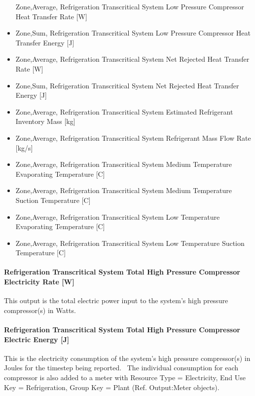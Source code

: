 \begin{itemize}
  Zone,Average, Refrigeration Transcritical System Low Pressure Compressor Heat Transfer Rate {[}W{]}
\item
  Zone,Sum, Refrigeration Transcritical System Low Pressure Compressor Heat Transfer Energy {[}J{]}
\item
  Zone,Average, Refrigeration Transcritical System Net Rejected Heat Transfer Rate {[}W{]}
\item
  Zone,Sum, Refrigeration Transcritical System Net Rejected Heat Transfer Energy {[}J{]}
\item
  Zone,Average, Refrigeration Transcritical System Estimated Refrigerant Inventory Mass {[}kg{]}
\item
  Zone,Average, Refrigeration Transcritical System Refrigerant Mass Flow Rate {[}kg/s{]}
\item
  Zone,Average, Refrigeration Transcritical System Medium Temperature Evaporating Temperature {[}C{]}
\item
  Zone,Average, Refrigeration Transcritical System Medium Temperature Suction Temperature {[}C{]}
\item
  Zone,Average, Refrigeration Transcritical System Low Temperature Evaporating Temperature {[}C{]}
\item
  Zone,Average, Refrigeration Transcritical System Low Temperature Suction Temperature {[}C{]}
\end{itemize}

\paragraph{Refrigeration Transcritical System Total High Pressure Compressor Electricity Rate {[}W{]}}\label{refrigeration-transcritical-system-total-high-pressure-compressor-electric-power-w}

This output is the total electric power input to the system's high pressure compressor(s) in Watts.

\paragraph{Refrigeration Transcritical System Total High Pressure Compressor Electric Energy {[}J{]}}\label{refrigeration-transcritical-system-total-high-pressure-compressor-electric-energy-j}

This is the electricity consumption of the system's high pressure compressor(s) in Joules for the timestep being reported.~ The individual consumption for each compressor is also added to a meter with Resource Type = Electricity, End Use Key = Refrigeration, Group Key = Plant (Ref. Output:Meter objects).

